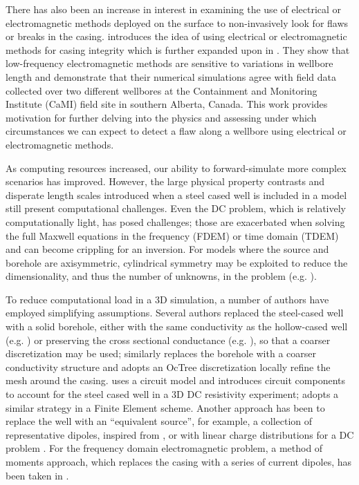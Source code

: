There has also been an increase in interest in examining the use of electrical or electromagnetic methods deployed on the surface to non-invasively look for flaws or breaks in the casing. \cite{Wilt2018} introduces the idea of using electrical or electromagnetic methods for casing integrity which is further expanded upon in \cite{Wilt2018a}. They show that low-frequency electromagnetic methods are sensitive to variations in wellbore length and demonstrate that their numerical simulations agree with field data collected over two different wellbores at the Containment and Monitoring Institute (CaMI) field site in southern Alberta, Canada. This work provides motivation for further delving into the physics and assessing under which circumstances we can expect to detect a flaw along a wellbore using electrical or electromagnetic methods.

As computing resources increased, our ability to forward-simulate more complex scenarios has improved. However, the large physical property contrasts and disperate length scales introduced when a steel cased well is included in a model still present computational challenges. Even the DC problem, which is relatively computationally light, has posed challenges; those are exacerbated when solving the full Maxwell equations in the frequency (FDEM) or time domain (TDEM) and can become crippling for an inversion. For models where the source and borehole are axisymmetric, cylindrical symmetry may be exploited to reduce the dimensionality, and thus the number of unknowns, in the problem (e.g. \cite{Pardo2013, Heagy2015}).

To reduce computational load in a 3D simulation, a number of authors have employed simplifying assumptions. Several authors replaced the steel-cased well with a solid borehole, either with the same conductivity as the hollow-cased well (e.g. \cite{Um2015, Puzyrev2017}) or preserving the cross sectional conductance (e.g. \cite{Swidinsky2013, Kohnke2017}), so that a coarser discretization may be used; \cite{Haber2016} similarly replaces the borehole with a coarser conductivity structure and adopts an OcTree discretization locally refine the mesh around the casing. \cite{Yang2016} uses a circuit model and introduces circuit components to account for the steel cased well in a 3D DC resistivity experiment; \cite{Weiss2017} adopts a similar strategy in a Finite Element scheme. Another approach has been to replace the well with an ``equivalent source'', for example, a collection of representative dipoles, inspired from \cite{cuevas2014}, or with linear charge distributions for a DC problem \citep{Weiss2016}. For the frequency domain electromagnetic problem, a method of moments approach, which replaces the casing with a series of current dipoles, has been taken in \cite{Kohnke2017}.

